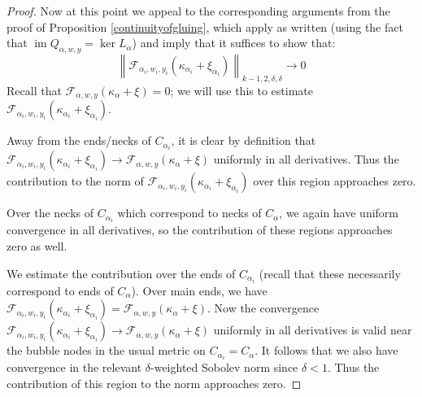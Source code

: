 \documentclass[12pt]{article}
\theoremstyle{definition}
\theoremstyle{remark}
\numberwithin{equation}{subsection}
\newcommand{\F}{\mathcal F}
\newcommand{\im}{\operatorname{im}}
\begin{document}
\begin{proof}
Now at this point we appeal to the corresponding arguments from the proof of Proposition \ref{continuityofgluing}, which apply as written (using the fact that $\im Q_{\alpha,w,y}=\ker L_\alpha$) and imply that it suffices to show that:
\begin{equation}\label{pregluedcorrectionalmostholHF}
\left\|\F_{\alpha_i,w_i,y_i}(\kappa_{\alpha_i}+\xi_{\alpha_i})\right\|_{k-1,2,\delta,\delta}\to 0
\end{equation}
Recall that $\F_{\alpha,w,y}(\kappa_\alpha+\xi)=0$; we will use this to estimate $\F_{\alpha_i,w_i,y_i}(\kappa_{\alpha_i}+\xi_{\alpha_i})$.

Away from the ends/necks of $C_{\alpha_i}$, it is clear by definition that $\F_{\alpha_i,w_i,y_i}(\kappa_{\alpha_i}+\xi_{\alpha_i})\to\F_{\alpha,w,y}(\kappa_\alpha+\xi)$ uniformly in all derivatives.  Thus the contribution to the norm of $\F_{\alpha_i,w_i,y_i}(\kappa_{\alpha_i}+\xi_{\alpha_i})$ over this region approaches zero.

Over the necks of $C_{\alpha_i}$ which correspond to necks of $C_\alpha$, we again have uniform convergence in all derivatives, so the contribution of these regions approaches zero as well.

We estimate the contribution over the ends of $C_{\alpha_i}$ (recall that these necessarily correspond to ends of $C_\alpha$).  Over main ends, we have $\F_{\alpha_i,w_i,y_i}(\kappa_{\alpha_i}+\xi_{\alpha_i})=\F_{\alpha,w,y}(\kappa_\alpha+\xi)$.  Now the convergence $\F_{\alpha_i,w_i,y_i}(\kappa_{\alpha_i}+\xi_{\alpha_i})\to\F_{\alpha,w,y}(\kappa_\alpha+\xi)$ uniformly in all derivatives is valid near the bubble nodes in the usual metric on $C_{\alpha_i}=C_\alpha$.  It follows that we also have convergence in the relevant $\delta$-weighted Sobolev norm since $\delta<1$.  Thus the contribution of this region to the norm approaches zero.


\end{proof}
\end{document}
